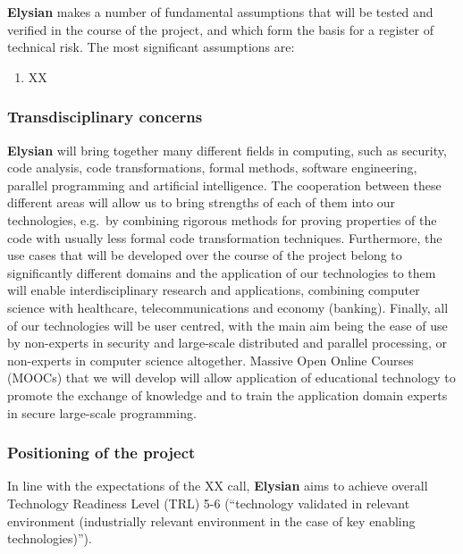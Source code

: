 \documentclass[a4paper,11pt]{article}
\newcommand{\project}[1]{\textbf{#1}\xspace}
\newcommand{\SECURITY}{\project{Elysian}}
\newcommand{\TheProject}{\SECURITY}
\begin{document}

\TheProject{} makes a number of fundamental assumptions that will be tested and verified in the course of the project,
and which form the basis for a register of technical risk.  The most significant assumptions are:

\begin{enumerate}[{A}1)]
\item XX
\end{enumerate}

\subsubsection*{Transdisciplinary concerns}
\TheProject{} will bring together many different fields in computing, such as security, code analysis, code transformations, formal methods, software engineering, parallel programming and artificial intelligence. The cooperation between these different areas will allow us to bring strengths of each of them into our technologies, e.g.~by combining rigorous methods for proving properties of the code with usually less formal code transformation techniques. Furthermore, the use cases that will be developed over the course of the project belong to significantly different domains and the application of our technologies to them will enable interdisciplinary research and applications, combining computer science with healthcare, telecommunications and economy (banking). Finally, all of our technologies will be user centred, with the main aim being the ease of use by non-experts in security and large-scale distributed and parallel processing, or non-experts in computer science altogether. Massive Open Online Courses (MOOCs) that we will develop will allow application of educational technology to promote the exchange of knowledge and to train the application domain experts in secure large-scale programming. 

\subsubsection{Positioning of the project}

In line with the expectations of the XX call, \TheProject{} aims
to achieve overall Technology Readiness Level (TRL) 5-6 (``technology
validated in relevant environment (industrially relevant environment in
the case of key enabling technologies)'').
\end{document}
